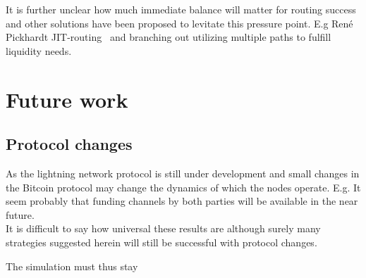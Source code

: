 It is further unclear how much immediate balance will matter for routing success and other solutions have been proposed to levitate this pressure point. E.g René Pickhardt JIT-routing~\cite{pickard:jit} and branching out utilizing multiple paths to fulfill liquidity needs.   

\section{Future work}

\subsection{Protocol changes}

As the lightning network protocol is still under development and small changes in the Bitcoin protocol may change the dynamics of which the nodes operate. E.g. It seem probably that funding channels by both parties will be available in the near future. \\

It is difficult to say how universal these results are although surely many strategies suggested herein will still be successful with protocol changes.

The simulation must thus stay 



